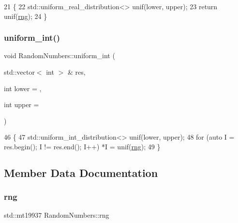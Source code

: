 \begin{DoxyCode}
21                                                                \{
22     std::uniform\_real\_distribution<> unif(lower, upper);
23     \textcolor{keywordflow}{return} unif(\mbox{\hyperlink{classRandomNumbers_a15ceee85d6d00de12ae76c90aaec2f14}{rng}});
24 \}
\end{DoxyCode}
\mbox{\label{classRandomNumbers_a905a78d8d1dbb9b5b98472cc42b94a98}} 
\subsubsection{\texorpdfstring{uniform\+\_\+int()}{uniform\_int()}}
{\footnotesize\ttfamily void Random\+Numbers\+::uniform\+\_\+int (\begin{DoxyParamCaption}\item[{std\+::vector$<$ int $>$ \&}]{res,  }\item[{int}]{lower = {},  }\item[{int}]{upper = {} }\end{DoxyParamCaption})}


\begin{DoxyCode}
46                                                                          \{
47     std::uniform\_int\_distribution<> unif(lower, upper);
48     \textcolor{keywordflow}{for} (\textcolor{keyword}{auto} I = res.begin(); I != res.end(); I++) *I = unif(\mbox{\hyperlink{classRandomNumbers_a15ceee85d6d00de12ae76c90aaec2f14}{rng}});
49 \}
\end{DoxyCode}


\subsection{Member Data Documentation}
\mbox{\label{classRandomNumbers_a15ceee85d6d00de12ae76c90aaec2f14}} 
\subsubsection{\texorpdfstring{rng}{rng}}
{\footnotesize\ttfamily std\+::mt19937 Random\+Numbers\+::rng\hspace{0.3cm}{\ttfamily [private]}}

